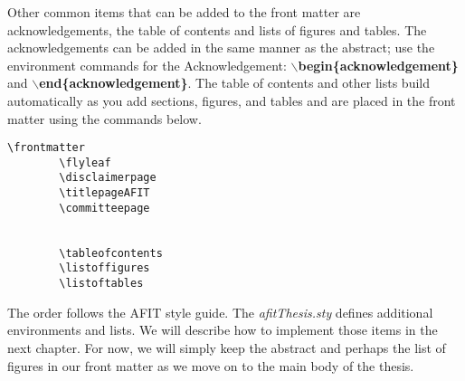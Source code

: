 Other common items that can be added to the front matter are
acknowledgements, the table of contents and lists of figures and
tables.  The acknowledgements can be added in the same manner as the
abstract; use the environment commands for the
Acknowledgement: {\bf $\backslash$begin\{acknowledgement\}} and {\bf
$\backslash$end\{acknowledgement\}}.  The table of contents and other lists
build automatically as you add sections, figures, and tables and are placed
in the front matter using the commands below.  

\vspace{-0.3in} {\singlespace
\begin{verbatim}
\frontmatter
        \flyleaf                        
        \disclaimerpage                 
        \titlepageAFIT                      
        \committeepage
        
        
        \tableofcontents
        \listoffigures
        \listoftables
\end{verbatim}
}

\noindent The order follows the AFIT style guide\cite{AFITStyle}.  The {\em
afitThesis.sty} defines additional environments and lists.  We
will describe how to implement those items in the next chapter.
For now, we will simply keep the abstract and perhaps the list of
figures in our front matter as we move on to the
main body of the thesis.





